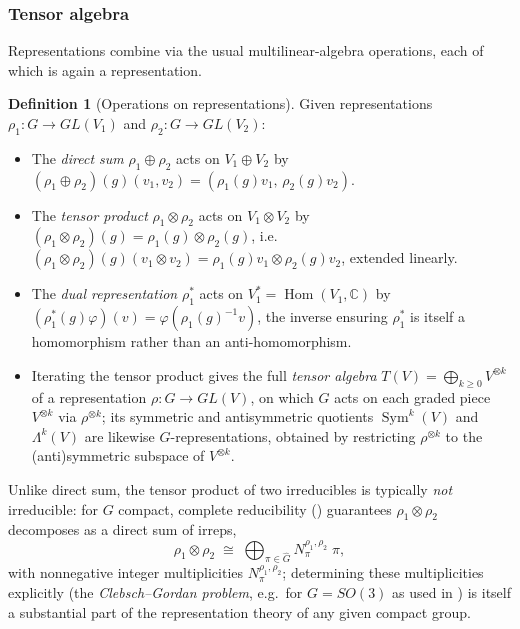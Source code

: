 \documentclass[11pt]{article}
\theoremstyle{plain}
\theoremstyle{definition}
\newtheorem{Definition}{Definition}[section]
\begin{document}
\subsubsection{Tensor algebra}
\label{subsubsec:tensor-algebra}

Representations combine via the usual multilinear-algebra operations, each
of which is again a representation.

\begin{Definition}[Operations on representations]
\label{def:tensor-operations}
Given representations $\rho_1 : G \to GL(V_1)$ and $\rho_2 : G \to GL(V_2)$:
\begin{itemize}
    \item The \emph{direct sum} $\rho_1 \oplus \rho_2$ acts on
    $V_1 \oplus V_2$ by $(\rho_1 \oplus \rho_2)(g)(v_1,v_2) =
    (\rho_1(g)v_1,\, \rho_2(g)v_2)$.
    \item The \emph{tensor product} $\rho_1 \otimes \rho_2$ acts on
    $V_1 \otimes V_2$ by
    $(\rho_1 \otimes \rho_2)(g) = \rho_1(g) \otimes \rho_2(g)$, i.e.\
    $(\rho_1\otimes\rho_2)(g)(v_1 \otimes v_2) = \rho_1(g)v_1 \otimes \rho_2(g)v_2$,
    extended linearly.
    \item The \emph{dual representation} $\rho_1^*$ acts on
    $V_1^* = \operatorname{Hom}(V_1,\mathbb{C})$ by
    $(\rho_1^*(g)\varphi)(v) = \varphi(\rho_1(g)^{-1} v)$, the inverse
    ensuring $\rho_1^*$ is itself a homomorphism rather than an
    anti-homomorphism.
    \item Iterating the tensor product gives the full \emph{tensor algebra}
    $T(V) = \bigoplus_{k \geq 0} V^{\otimes k}$ of a representation
    $\rho: G \to GL(V)$, on which $G$ acts on each graded piece
    $V^{\otimes k}$ via $\rho^{\otimes k}$; its symmetric and antisymmetric
    quotients $\operatorname{Sym}^k(V)$ and $\Lambda^k(V)$ are likewise
    $G$-representations, obtained by restricting $\rho^{\otimes k}$ to the
    (anti)symmetric subspace of $V^{\otimes k}$.
\end{itemize}
\end{Definition}

Unlike direct sum, the tensor product of two irreducibles is typically
\emph{not} irreducible: for $G$ compact, complete reducibility
() guarantees $\rho_1 \otimes \rho_2$ decomposes
as a direct sum of irreps,
\[
    \rho_1 \otimes \rho_2 \;\cong\; \bigoplus_{\pi \in \widehat{G}} N_{\pi}^{\rho_1,\rho_2}\; \pi,
\]
with nonnegative integer multiplicities $N_\pi^{\rho_1,\rho_2}$; determining
these multiplicities explicitly (the \emph{Clebsch--Gordan problem}, e.g.\
for $G = SO(3)$ as used in \citep{kondor2018p3icml}) is itself a substantial
part of the representation theory of any given compact group.
\end{document}
